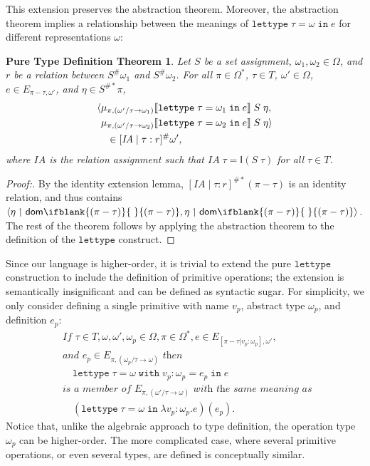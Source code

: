 \documentclass[sigplan,screen,nonacm,balance=false]{acmart}
\theoremstyle{plain}
\DeclarePairedDelimiter{\pair}{\langle}{\rangle}
\DeclarePairedDelimiter{\interp}{\llbracket}{\rrbracket}
\newcommand{\lettype}{\mathtt{lettype}}
\newcommand{\lettypein}[3]{\mathtt{lettype} \; #1 = #2 \; \mathtt{in} \; #3}
\newcommand{\letwith}[6]{\mathtt{lettype} \; #1 = #2 \; \mathtt{with} \; #3 : #4 = #5 \; \mathtt{in} \; #6}
\newcommand{\dom}[1]{\mathsf{dom}\ifblank{#1}{\;}{#1}}
\newcommand{\Id}{\mathsf{I}}
\newcommand{\IA}{\mathit{IA}}
\begin{document}
This extension preserves the abstraction theorem.
Moreover, the abstraction theorem implies a relationship between the meanings of $\lettypein{\tau}{\omega}{e}$ for different representations $\omega$:

\newtheorem{puretypedef}{Pure Type Definition Theorem}
\begin{puretypedef}
Let $S$ be a set assignment, $\omega_1, \omega_2 \in \Omega$, and $r$ be a relation between $S^\# \omega_1$ and $S^\# \omega_2$.
For all $\pi \in \Omega^*$, $\tau \in T$, $\omega' \in \Omega$, $e \in E_{\pi - \tau, \omega'}$, and $\eta \in S^{\#*} \pi$,
%
\begin{align*}
  &\pair{\mu_{\pi, (\omega'/\tau \to \omega_1)} \interp{\lettypein{\tau}{\omega_1}{e}} \; S \; \eta, \\
  &\phantom{\langle} \mu_{\pi, (\omega'/\tau \to \omega_2)} \interp{\lettypein{\tau}{\omega_2}{e}} \; S \; \eta} \\
  &\quad \in [\IA \mid \tau : r]^\# \omega',
\end{align*}
%
where $\IA$ is the relation assignment such that $\IA \; \tau = \Id(S \; \tau)$ for all $\tau \in T$.
\end{puretypedef}

\begin{proof}[Proof:\nopunct]
  By the identity extension lemma, $[\IA \mid \tau : r]^{\#*} (\pi - \tau)$ is an identity relation, and thus contains $\pair{\eta \upharpoonleft \dom{(\pi - \tau)}, \eta \upharpoonleft \dom{(\pi - \tau)}}$.
  The rest of the theorem follows by applying the abstraction theorem to the definition of the $\lettype$ construct.
\end{proof}

Since our language is higher-order, it is trivial to extend the pure $\lettype$ construction to include the definition of primitive operations; the extension is semantically insignificant and can be defined as syntactic sugar.
For simplicity, we only consider defining a single primitive with name $v_p$, abstract type $\omega_p$, and definition $e_p$:
\begin{align*}
  & \textit{If } \tau \in T, \omega, \omega', \omega_p \in \Omega, \pi \in \Omega^*, e \in E_{[\pi - \tau | v_p : \omega_p], \omega'}, \\
  & \textit{and } e_p \in E_{\pi, (\omega_p/\tau \to \omega)} \textit{ then } \\
  & \quad \letwith{\tau}{\omega}{v_p}{\omega_p}{e_p}{e} \\
  & \textit{is a member of } E_{\pi, (\omega'/\tau \to \omega)} \textit{ with the same meaning as } \\
  & \quad (\lettypein{\tau}{\omega}{\lambda v_p : \omega_p . e})(e_p).
\end{align*}
%
Notice that, unlike the algebraic approach to type definition, the operation type $\omega_p$ can be higher-order.
The more complicated case, where several primitive operations, or even several types, are defined is conceptually similar.
\end{document}
